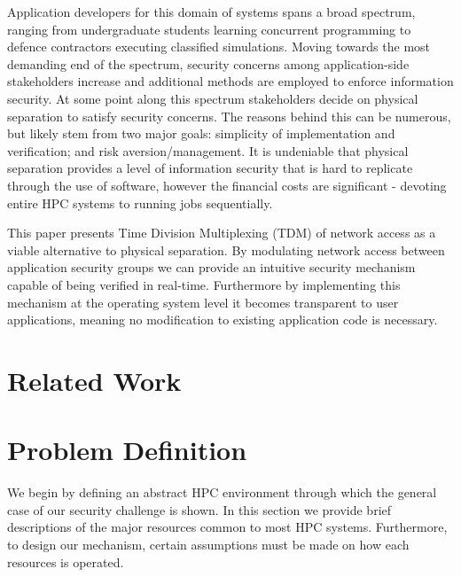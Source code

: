 \documentclass{llncs}
\begin{document}
Application developers for this domain of systems spans a broad spectrum, ranging from undergraduate students learning concurrent programming to defence contractors executing classified simulations. Moving towards the most demanding end of the spectrum, security concerns among application-side stakeholders increase and additional methods are employed to enforce information security. At some point along this spectrum stakeholders decide on physical separation to satisfy security concerns. The reasons behind this can be numerous, but likely stem from two major goals: simplicity of implementation and verification; and risk aversion/management. It is undeniable that physical separation provides a level of information security that is hard to replicate through the use of software, however the financial costs are significant - devoting entire HPC systems to running jobs sequentially. 


This paper presents Time Division Multiplexing (TDM) of network access as a viable alternative to physical separation. By modulating network access between application security groups we can provide an intuitive security mechanism capable of being verified in real-time. Furthermore by implementing this mechanism at the operating system level it becomes transparent to user applications, meaning no modification to existing application code is necessary. 
\section{Related Work}
\section{Problem Definition}
We begin by defining an abstract HPC environment through which the general case of our security challenge is shown. In this section we provide brief descriptions of the major resources common to most HPC systems. Furthermore, to design our mechanism, certain assumptions must be made on how each resources is operated. 
\end{document}
